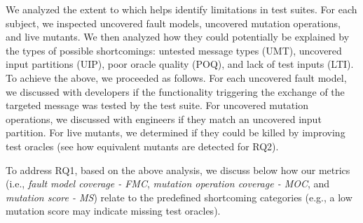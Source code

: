 We analyzed the extent to which \APPR helps identify limitations in test suites.
For each subject, we inspected uncovered fault models, uncovered mutation operations, and live mutants. We then analyzed how they could potentially be explained by the types of possible shortcomings:
untested message types (UMT), uncovered input partitions (UIP), poor oracle quality (POQ), and lack of test inputs (LTI).
To achieve the above, we proceeded as follows.
For each uncovered fault model, we discussed with developers if the functionality triggering the exchange of the targeted message was tested by the test suite.
For uncovered mutation operations, we discussed with engineers if they match an uncovered input partition.
For live mutants, we determined if they could be killed by improving test oracles (see how equivalent mutants are detected for RQ2).

To address RQ1, based on the above analysis, we discuss below how our metrics (i.e., \emph{fault model coverage - FMC}, \emph{mutation operation coverage - MOC}, and \emph{mutation score - MS}) relate to the predefined shortcoming categories {(e.g., a low mutation score may indicate missing test oracles)}.




